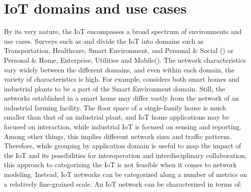 \documentclass{acm_proc_article-sp}
\begin{document}
\section{IoT domains and use cases}
\label{sec:Scenarios}
By its very nature, the IoT encompasses a broad spectrum of environments and use cases.
Surveys such as \cite{IoT_survey_Atzori} and \cite{IoT_survey_Gubbi} divide the IoT into domains such as Transportation, Healthcare, Smart Environment, and Personal \& Social (\cite{IoT_survey_Atzori}) or Personal \& Home, Enterprise, Utilities and Mobile(\cite{IoT_survey_Gubbi}).
The network characteristics vary widely between the different domains, and even within each domain, the variety of characteristics is high. For example,\cite{IoT_survey_Atzori} considers both smart homes and industrial plants to be a part of the Smart Environment domain. Still, the networks established in a smart home may differ vastly from the network of an industrial farming facility. The floor space of a single-family house is much smaller than that of an industrial plant, and IoT home applications may be focused on interaction, while industrial IoT is focused on sensing and reporting.
Among other things, this implies different network sizes and traffic patterns.\\
Therefore, while grouping by application domain is useful to map the impact of the IoT and its possibilities for interoperation and interdisciplinary collaboration, this approach to categorizing the IoT is not feasible when it comes to network modeling. Instead, IoT networks can be categorized along a number of metrics on a relatively fine-grained scale. An IoT network can be characterized in terms of:
\end{document}
